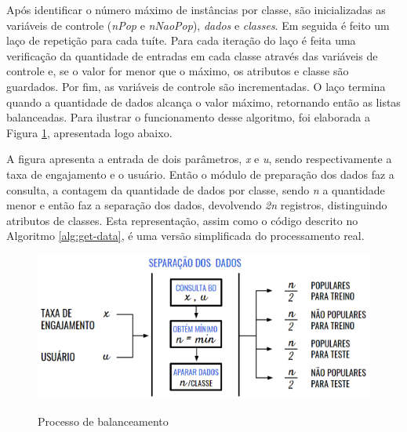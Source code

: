 \documentclass[oneside,openright,12pt]{ufsm_2015} %
\begin{document}
    \par Após identificar o número máximo de instâncias por classe, são inicializadas as variáveis de controle (\textit{nPop} e \textit{nNaoPop}), \textit{dados} e \textit{classes}. Em seguida é feito um laço de repetição para cada tuíte. Para cada iteração do laço é feita uma verificação da quantidade de entradas em cada classe através das variáveis de controle e, se o valor for menor que o máximo, os atributos e classe são guardados. Por fim, as variáveis de controle são incrementadas. O laço termina quando a quantidade de dados alcança o valor máximo, retornando então as listas balanceadas. Para ilustrar o funcionamento desse algoritmo, foi elaborada a Figura \ref{fig:balanceamento}, apresentada logo abaixo.
    
    \par A figura apresenta a entrada de dois parâmetros, \textit{x} e \textit{u}, sendo respectivamente a taxa de engajamento e o usuário. Então o módulo de preparação dos dados faz a consulta, a contagem da quantidade de dados por classe, sendo \textit{n} a quantidade menor e então faz a separação dos dados, devolvendo \textit{2n} registros, distinguindo atributos de classes. Esta representação, assim como o código descrito no Algoritmo \ref{alg:get-data}, é uma versão simplificada do processamento real. %
    
    \begin{figure}[H]
        \caption{Processo de balanceamento}
        \centering
        \includegraphics[width=1\textwidth]{figuras/balanceamento.png}
        \vspace{\baselineskip} %
        \label{fig:balanceamento}
    \end{figure}
\end{document}
